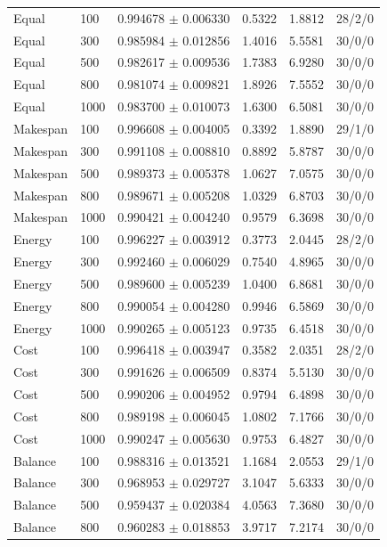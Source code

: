 \documentclass[pdflatex,onecolumn,sn-mathphys-num]{sn-jnl}
\begin{document}
\begin{table}[!htbp]
\begin{tabular}{@{}p{}p{}p{}p{}p{}p{}@{}}
Equal & 100 & 0.994678 $\pm$ 0.006330 & 0.5322 & 1.8812 & 28/2/0 \\
Equal & 300 & 0.985984 $\pm$ 0.012856 & 1.4016 & 5.5581 & 30/0/0 \\
Equal & 500 & 0.982617 $\pm$ 0.009536 & 1.7383 & 6.9280 & 30/0/0 \\
Equal & 800 & 0.981074 $\pm$ 0.009821 & 1.8926 & 7.5552 & 30/0/0 \\
Equal & 1000 & 0.983700 $\pm$ 0.010073 & 1.6300 & 6.5081 & 30/0/0 \\
Makespan & 100 & 0.996608 $\pm$ 0.004005 & 0.3392 & 1.8890 & 29/1/0 \\
Makespan & 300 & 0.991108 $\pm$ 0.008810 & 0.8892 & 5.8787 & 30/0/0 \\
Makespan & 500 & 0.989373 $\pm$ 0.005378 & 1.0627 & 7.0575 & 30/0/0 \\
Makespan & 800 & 0.989671 $\pm$ 0.005208 & 1.0329 & 6.8703 & 30/0/0 \\
Makespan & 1000 & 0.990421 $\pm$ 0.004240 & 0.9579 & 6.3698 & 30/0/0 \\
Energy & 100 & 0.996227 $\pm$ 0.003912 & 0.3773 & 2.0445 & 28/2/0 \\
Energy & 300 & 0.992460 $\pm$ 0.006029 & 0.7540 & 4.8965 & 30/0/0 \\
Energy & 500 & 0.989600 $\pm$ 0.005239 & 1.0400 & 6.8681 & 30/0/0 \\
Energy & 800 & 0.990054 $\pm$ 0.004280 & 0.9946 & 6.5869 & 30/0/0 \\
Energy & 1000 & 0.990265 $\pm$ 0.005123 & 0.9735 & 6.4518 & 30/0/0 \\
Cost & 100 & 0.996418 $\pm$ 0.003947 & 0.3582 & 2.0351 & 28/2/0 \\
Cost & 300 & 0.991626 $\pm$ 0.006509 & 0.8374 & 5.5130 & 30/0/0 \\
Cost & 500 & 0.990206 $\pm$ 0.004952 & 0.9794 & 6.4898 & 30/0/0 \\
Cost & 800 & 0.989198 $\pm$ 0.006045 & 1.0802 & 7.1766 & 30/0/0 \\
Cost & 1000 & 0.990247 $\pm$ 0.005630 & 0.9753 & 6.4827 & 30/0/0 \\
Balance & 100 & 0.988316 $\pm$ 0.013521 & 1.1684 & 2.0553 & 29/1/0 \\
Balance & 300 & 0.968953 $\pm$ 0.029727 & 3.1047 & 5.6333 & 30/0/0 \\
Balance & 500 & 0.959437 $\pm$ 0.020384 & 4.0563 & 7.3680 & 30/0/0 \\
Balance & 800 & 0.960283 $\pm$ 0.018853 & 3.9717 & 7.2174 & 30/0/0 \\

\end{tabular}
\end{table}
\end{document}
